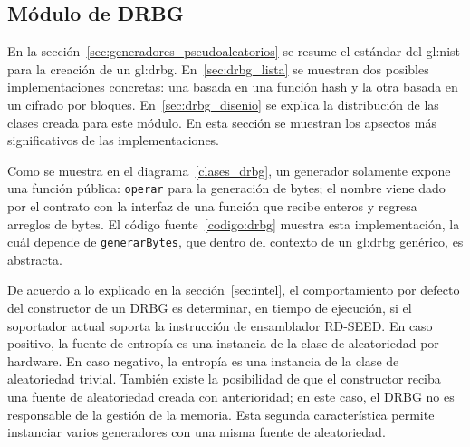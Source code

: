 %
%
%

\subsection{Módulo de DRBG}
\label{sec:implementacion_drbg}

En la sección~\ref{sec:generadores_pseudoaleatorios} se resume el estándar del
\gls{gl:nist} para la  creación de un \gls{gl:drbg}. En~\ref{sec:drbg_lista} se
muestran dos posibles implementaciones concretas: una basada en una función
hash y la  otra basada en un cifrado por bloques. En~\ref{sec:drbg_disenio} se
explica la distribución de las clases creada para este módulo. En esta sección
se muestran los apsectos más significativos de las implementaciones.


Como se muestra en el diagrama~\ref{clases_drbg}, un generador solamente
expone una función pública: \texttt{operar} para la generación de bytes; el
nombre viene dado por el contrato con la interfaz de una función que
recibe enteros y regresa arreglos de bytes. El código fuente~\ref{codigo:drbg}
muestra esta implementación, la cuál depende de \texttt{generarBytes}, que
dentro del contexto de un \gls{gl:drbg} genérico, es abstracta.

De acuerdo a lo explicado en la sección~\ref{sec:intel}, el comportamiento por
defecto del constructor de un DRBG es determinar, en tiempo de ejecución, si el
soportador actual soporta la instrucción de ensamblador RD-SEED. En caso
positivo, la fuente de entropía es una instancia de la clase de aleatoriedad
por hardware. En caso negativo, la entropía es una instancia de la clase de
aleatoriedad trivial. También existe la posibilidad de que el constructor
reciba una fuente de aleatoriedad creada con anterioridad; en este caso, el
DRBG no es responsable de la gestión de la memoria. Esta segunda
característica permite instanciar varios generadores con una misma fuente de
aleatoriedad.



